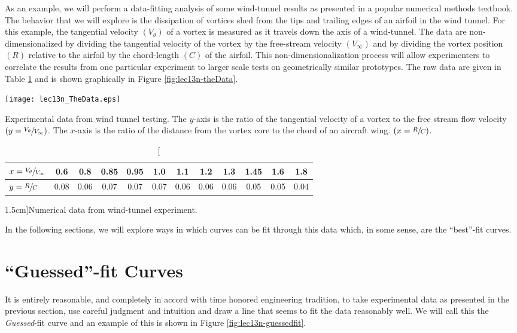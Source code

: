 As an example, we will perform a data-fitting analysis of some wind-tunnel
results as presented in a popular numerical methods textbook.\cite[-1.5cm]{gilat} The behavior that we will explore is the dissipation of vortices shed from the tips and trailing
edges of an airfoil in the wind tunnel.  For this example, the tangential
velocity $\left(V_{\theta}\right)$ of a vortex is measured as it travels down the axis of a
wind-tunnel.  The data are non-dimensionalized by dividing the tangential
velocity of the vortex by the free-stream velocity $\left(V_{\infty}\right)$ and by dividing the vortex
position $\left(R\right)$ relative to the airfoil by the chord-length $\left(C\right)$ of the airfoil.  This non-dimensionalization process will allow experimenters to correlate the results from one particular experiment to larger scale tests on geometrically similar prototypes.  The raw data are given in Table \ref{tab:lec13n-numData} and is shown graphically in Figure \ref{fig:lec13n-theData}.
\begin{marginfigure}[-2.5cm]
\texttt{[image: lec13n\_TheData.eps]}
\caption{Experimental data from wind tunnel testing.  The $y$-axis is the
  ratio of the tangential velocity of a vortex to the free stream flow
  velocity $\left( y = \sfrac{V_{\theta}}{V_{\infty}}\right)$.  The $x$-axis is
  the ratio of the distance from the vortex core to the chord of an aircraft
  wing. $\left(x = \sfrac{R}{C}\right)$.}
\label{fig:lec13n-theData}
\end{marginfigure}
\begin{table}[h]
\centering
\begin{tabular}{|l|*{11}{c}|}
\hline
$x = \sfrac{V_{\theta}}{V_{\infty}}$ & 0.6 & 0.8 & 0.85 & 0.95 & 1.0 & 1.1 &
  1.2 & 1.3 & 1.45 & 1.6 & 1.8 \\
\hline
$y = \sfrac{R}{C}$ & 0.08 & 0.06 & 0.07 & 0.07 & 0.07 & 0.06 & 0.06 & 0.06 & 0.05 &
  0.05 & 0.04 \\
\hline
\end{tabular}
\caption[][1.5cm]{Numerical data from wind-tunnel experiment.}
\label{tab:lec13n-numData}
\end{table}
In the following sections, we will explore ways in which curves can be fit through this data which, in some sense, are the ``best''-fit curves.

\section{``Guessed''-fit Curves}
It is entirely reasonable, and completely in accord with time honored engineering tradition, to take experimental data as presented in the previous section, use careful judgment and intuition and draw a line that seems to fit the data reasonably well. We will call this the \emph{Guessed}-fit curve and an example of this is shown in Figure \ref{fig:lec13n-guessedfit}.

